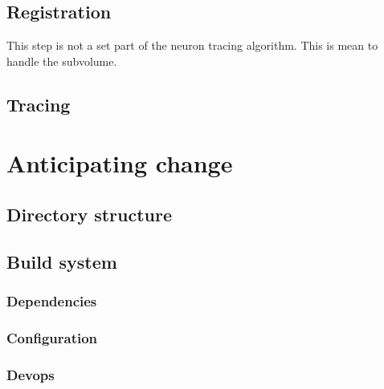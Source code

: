 \subsection{Registration}

This step is not a set part of the neuron tracing algorithm. This is mean to handle the subvolume.

\subsection{Tracing}



\section{Anticipating change}


\subsection{Directory structure}

\begin{description}[font=\tt]
\item[lib]
\item[lib/t]
\item[src]
\end{description}


\subsection{Build system}


\subsubsection{Dependencies}


\subsubsection{Configuration}


\subsubsection{Devops}

